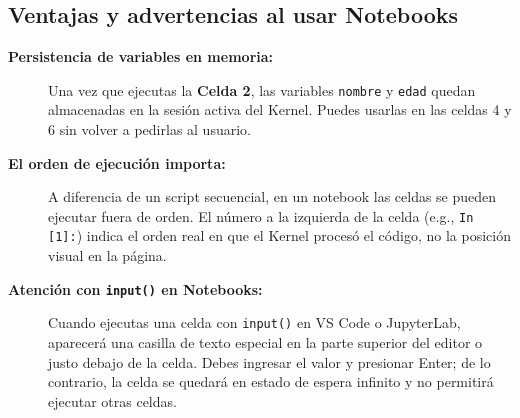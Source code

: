 \documentclass[12pt]{article}
\begin{document}
\subsection*{Ventajas y advertencias al usar Notebooks}

\begin{description}
    \item[\textbf{Persistencia de variables en memoria:}] Una vez que ejecutas la 
    \textbf{Celda 2}, las variables \lstinline|nombre| y \lstinline|edad| 
    quedan almacenadas en la sesión activa del Kernel. Puedes usarlas en las celdas 4 y 
    6 sin volver a pedirlas al usuario.
    \item[\textbf{El orden de ejecución importa:}] A diferencia de un script secuencial, 
    en un notebook las celdas se pueden ejecutar fuera de orden. El número a la izquierda 
    de la celda (e.g., \lstinline|In [1]:|) indica el orden real en que el Kernel procesó el 
    código, no la posición visual en la página.
    \item[\textbf{Atención con \texttt{input()} en Notebooks:}] Cuando ejecutas una celda con 
    \lstinline|input()| en VS Code o JupyterLab, aparecerá una casilla de texto especial en 
    la parte superior del editor o justo debajo de la celda. Debes ingresar el valor y presionar 
    Enter; de lo contrario, la celda se quedará en estado de espera 
    infinito y no permitirá ejecutar otras celdas.
\end{description}
\end{document}
